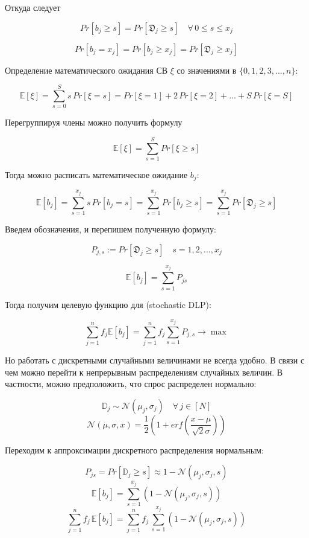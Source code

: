 \documentclass[reqno]{article}
\theoremstyle{definition}
\theoremstyle{definition}
\theoremstyle{definition}
\theoremstyle{definition}
\theoremstyle{definition}
\theoremstyle{definition}
\theoremstyle{definition}
\theoremstyle{definition}
\theoremstyle{definition}
\begin{document}
		Откуда следует
		
		$$Pr[b_j \geq s] = Pr[\mathfrak{D}_j \geq s]\quad \forall\,0 \leq s \leq x_j$$
		
		$$Pr[b_j = x_j] = Pr[b_j \geq x_j] = Pr[\mathfrak{D}_j \geq x_j]$$
		
		Определение математического ожидания СВ $\xi$ со значениями в $\{0, 1, 2, 3, ..., n\}$:
		
		$$\mathds{E}[\xi] = \sum\limits_{s = 0}^S s\,Pr[\xi = s] = Pr[\xi = 1] + 2\,Pr[\xi = 2] + ... + S\,Pr[\xi = S]$$
		
		Перегруппируя члены можно получить формулу
		
		\begin{equation}
			\mathds{E}[\xi] = \sum\limits_{s = 1}^S Pr[\xi \geq s]
		\end{equation}
		
		
		Тогда можно расписать математическое ожидание $b_j$:
		
		$$\mathds{E}[b_j] = \sum\limits_{s = 1}^{x_j} s\,Pr[b_j = s] = \sum\limits_{s = 1}^{x_j} Pr[b_j \geq s] = \sum\limits_{s = 1}^{x_j} Pr[\mathfrak{D}_j \geq s]$$
		
		Введем обозначения, и перепишем полученную формулу:
		
		$$P_{j,s} := Pr[\mathfrak{D}_j \geq s]\quad s = 1, 2, ..., x_j$$
		
		\begin{equation}
			\mathds{E}[b_j] = \sum\limits_{s = 1}^{x_j} P_{js}
		\end{equation}
		
		Тогда получим целевую функцию для (stochastic DLP):
		
		\begin{equation}
			\sum\limits_{j=1}^n f_j \mathds{E}[b_j] = \sum\limits_{j=1}^n f_j \sum\limits_{s = 1}^{x_j} P_{j,s} \rightarrow \max
		\end{equation}
	
		Но работать с дискретными случайными величинами не всегда удобно. В связи с чем можно перейти к непрерывным распределениям случайных величин. В частности, можно предположить, что спрос распределен нормально:
		
		$$\mathds{D}_j \sim \mathcal{N}(\mu_j, \sigma_j) \quad \forall\, j \in [N]$$
		$$\mathcal{N}(\mu, \sigma, x) = \frac{1}{2}(1 + {erf}(\frac{x - \mu}{\sqrt{2}\sigma}))$$
		
		Переходим к аппроксимации дискретного распределения нормальным:
		
		$$P_{js} = Pr[\mathds{D}_j \geq s] \approx 1 - \mathcal{N}(\mu_j, \sigma_j, s)$$
		$$\mathds{E}[b_j] = \sum\limits_{s = 1}^{x_j} (1 - \mathcal{N}(\mu_j, \sigma_j, s))$$
		$$\sum\limits^n_{j = 1} f_j\,\mathds{E}[b_j] = \sum\limits^n_{j = 1} f_j\,\sum\limits_{s = 1}^{x_j} (1 - \mathcal{N}(\mu_j, \sigma_j, s))$$
		
\end{document}
